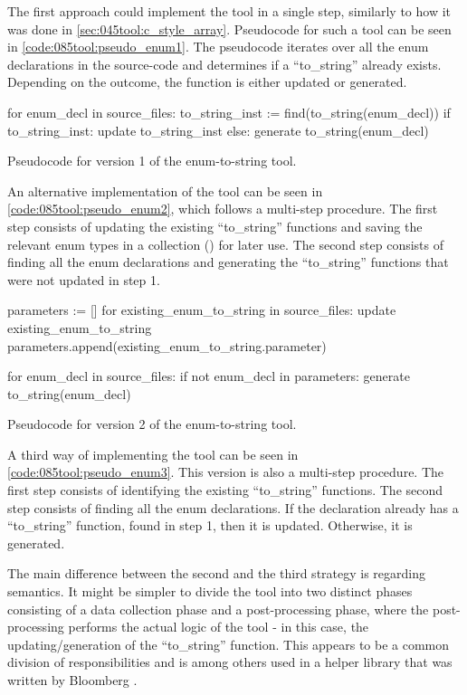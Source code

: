 The first approach could implement the tool in a single step, similarly to how it was done in \cref{sec:045tool:c_style_array}. Pseudocode for such a tool can be seen in \cref{code:085tool:pseudo_enum1}. The pseudocode iterates over all the enum declarations in the source-code and determines if a ``to\_string'' already exists. Depending on the outcome, the function is either updated or generated.

\begin{listing}[H]
    \begin{pythoncode}
for enum_decl in source_files:
    to_string_inst := find(to_string(enum_decl))
    if to_string_inst:
        update to_string_inst
    else:
        generate to_string(enum_decl)
    \end{pythoncode}
    \caption{Pseudocode for version 1 of the enum-to-string tool.}
    \label{code:085tool:pseudo_enum1}
\end{listing}

An alternative implementation of the tool can be seen in \cref{code:085tool:pseudo_enum2}, which follows a multi-step procedure. The first step consists of updating the existing ``to\_string'' functions and saving the relevant enum types in a collection () for later use. The second step consists of finding all the enum declarations and generating the ``to\_string'' functions that were not updated in step 1.

\begin{listing}[H]
    \begin{pythoncode}
parameters := []
for existing_enum_to_string in source_files:
    update existing_enum_to_string
    parameters.append(existing_enum_to_string.parameter)

for enum_decl in source_files:
    if not enum_decl in parameters:
        generate to_string(enum_decl)
    \end{pythoncode}
    \caption{Pseudocode for version 2 of the enum-to-string tool.}
    \label{code:085tool:pseudo_enum2}
\end{listing}

A third way of implementing the tool can be seen in \cref{code:085tool:pseudo_enum3}. This version is also a multi-step procedure. The first step consists of identifying the existing ``to\_string'' functions. The second step consists of finding all the enum declarations. If the declaration already has a ``to\_string'' function, found in step 1, then it is updated. Otherwise, it is generated.

The main difference between the second and the third strategy is regarding semantics. It might be simpler to divide the tool into two distinct phases consisting of a data collection phase and a post-processing phase, where the post-processing performs the actual logic of the tool - in this case, the updating/generation of the ``to\_string'' function. This appears to be a common division of responsibilities and is among others used in a helper library that was written by Bloomberg \cite{bloombergClangmetatoolFrameworkReusing2023}.

